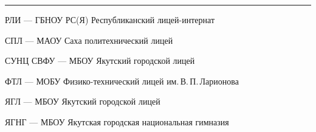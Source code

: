 \noindent\rule{3cm}{0.4pt}

\noindent РЛИ --- ГБНОУ РС(Я) Республиканский лицей-интернат

\noindent СПЛ --- МАОУ Саха политехнический лицей

\noindent СУНЦ СВФУ --- МБОУ Якутский городской лицей

\noindent ФТЛ --- МОБУ Физико-технический лицей им.\,В.\,П.\,Ларионова

\noindent ЯГЛ --- МБОУ Якутский городской лицей

\noindent ЯГНГ --- МБОУ Якутская городская национальная гимназия

